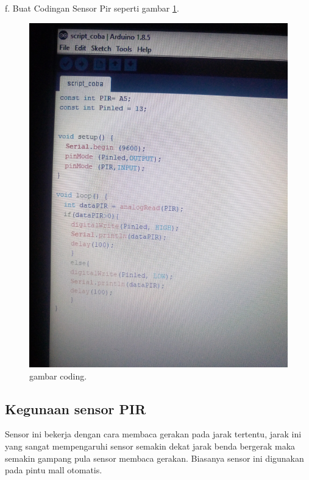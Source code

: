 f. Buat Codingan Sensor Pir seperti gambar \ref{coding}.

\begin{figure} [ht]
\centerline{\includegraphics[width=1\textwidth]{figures/coding.JPG}}
\caption{gambar coding.}
\label{coding}
\end{figure}

\subsection {Kegunaan sensor PIR}
Sensor ini bekerja dengan cara membaca gerakan pada jarak tertentu, jarak ini yang sangat mempengaruhi sensor semakin dekat jarak benda bergerak maka semakin gampang pula sensor membaca gerakan.
Biasanya sensor ini digunakan pada pintu mall otomatis.
